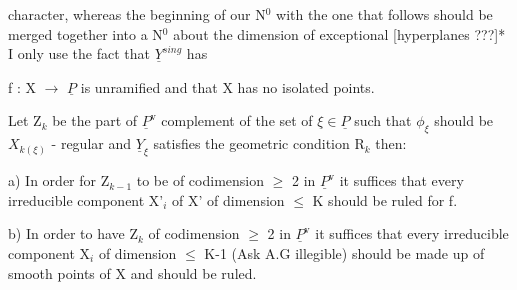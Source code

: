 
character, whereas the beginning of our N$^0$ with the one that
follows should be merged together into a N$^0$ about the dimension of
exceptional [hyperplanes ???]*  I only use the fact that $\underline{Y}^{sing}$ has
\par\noindent{}\par

f : X $\to$ $\underline{P}$ is unramified and that X has no isolated points.

Let Z$_k$ be the part of $\underline{P}^{\mathrm{v}}$ complement of the set of $\xi \in \underline{P}$ such that
$\phi_\xi$ should be $X_{k(\xi)}$ - regular and $\underline{Y}_\xi$ satisfies the geometric condition
R$_k$ then:

a) In order for Z$_{k-1}$ to be of codimension $\geq$ 2 in $\underline{P}^{\mathrm{v}}$ it
suffices that every irreducible component X'$_i$ of X' of dimension $\leq$
K should be ruled for f.

b) In order to have Z$_k$ of codimension $\geq$ 2 in $\underline{P}^{\mathrm{v}}$ it suffices
that every irreducible component X$_i$ of dimension $\leq$ K-1 (Ask A.G
illegible) should be made up of smooth points of X and should be
ruled.

